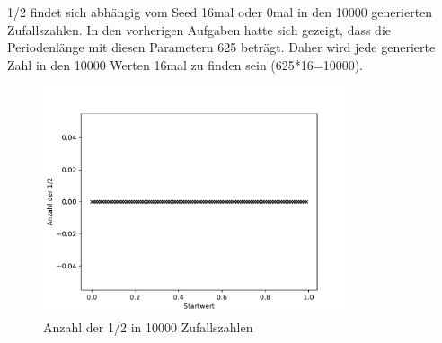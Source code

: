 1/2 findet sich abhängig vom Seed 16mal oder 0mal
in den 10000 generierten Zufallszahlen.
In den vorherigen Aufgaben hatte sich gezeigt, dass 
die Periodenlänge mit diesen Parametern 625 beträgt.
Daher wird jede generierte Zahl in den 10000
Werten 16mal zu finden sein (625*16=10000).

\begin{figure}[H]
  \centering
  \includegraphics[width=0.8\textwidth]{nr8_f.pdf}
  \caption{Anzahl der 1/2 in 10000 Zufallszahlen}
\end{figure}



